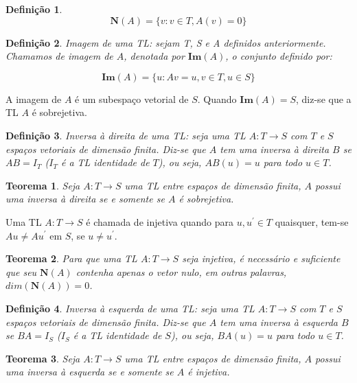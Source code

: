 \documentclass[a4paper,portuguese,9pt]{extarticle}
\newtheorem{theorem}{Teorema}[section]
\newtheorem*{definition}{Definição}
\begin{document}
\begin{multicols*}{2}
\begin{definition}
  \begin{equation*}
      \mathbf{N}(A) = \{v: v \in T, A(v)=0\}
  \end{equation*}
\end{definition}

\begin{definition}
Imagem de uma TL: sejam T, S e A definidos anteriormente. Chamamos de imagem de $A$, denotada por $\mathbf{Im}(A)$, o conjunto definido por:

      \begin{equation*}
      \mathbf{Im}(A) = \{u: Av = u, v \in T, u \in S\}
  \end{equation*}

\end{definition}

A imagem de $A$ é um subespaço vetorial de $S$. Quando $\mathbf{Im}(A)=S$, diz-se que a TL $A$ é sobrejetiva.

\begin{definition}
Inversa à direita de uma TL: seja uma TL $A:T \rightarrow S$ com $T$ e $S$ espaços vetoriais de dimensão finita. Diz-se que $A$ tem uma inversa à direita $B$ se $AB=I_T$ ($I_T$ é a TL identidade de $T$), ou seja, $AB(u)=u$ para todo $u \in T$.
\end{definition}

\begin{theorem}
Seja $A:T \rightarrow S$ uma TL entre espaços de dimensão finita, $A$ possui uma inversa à direita se e somente se $A$ é sobrejetiva.
\end{theorem}

Uma TL $A:T \rightarrow S$ é chamada de injetiva quando para $u,u^\prime
\in T$ quaisquer, tem-se $Au \ne Au^\prime$ em $S$, se $u \ne u^\prime$.

\begin{theorem}
Para que uma TL $A:T \rightarrow S$ seja injetiva, é necessário e suficiente que seu $\mathbf{N}(A)$ contenha apenas o vetor nulo, em outras palavras, $dim(\mathbf{N}(A)) = 0$.
\end{theorem}

\begin{definition}
Inversa à esquerda de uma TL: seja uma TL $A:T \rightarrow S$ com $T$ e $S$ espaços vetoriais de dimensão finita. Diz-se que $A$ tem uma inversa à esquerda $B$ se $BA=I_S$ ($I_S$ é a TL identidade de $S$), ou seja, $BA(u)=u$ para todo $u \in T$.
\end{definition}

\begin{theorem}
Seja $A:T \rightarrow S$ uma TL entre espaços de dimensão finita, $A$ possui
    uma inversa à esquerda se e somente se $A$ é injetiva.
\end{theorem}


\end{multicols*}
\end{document}
